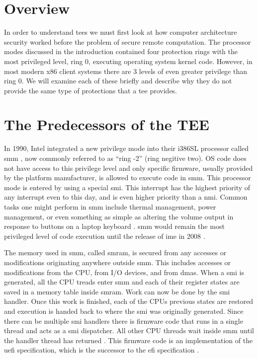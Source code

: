 \section{Overview}
In order to understand \glspl{tee} we must first look at how computer architecture security worked before the problem of secure remote computation. The processor modes discussed in the introduction contained four protection rings with the most privileged level, ring 0, executing operating system kernel code. However, in most modern x86 client systems there are 3 levels of even greater privilege than ring 0. We will examine each of these briefly and describe why they do not provide the same type of protections that a \gls{tee} provides.

\section{The Predecessors of the TEE}

In 1990, Intel integrated a new privilege mode into their i386SL processor called \gls{smm} \cite{zimmer2005hardened}, now commonly referred to as ``ring -2'' (ring negitive two).  OS code does not have access to this privilege level and only specific firmware, usually provided by the platform manufacturer, is allowed to execute code in \gls{smm}. This processor mode is entered by using a special \gls{smi}. This interrupt has the highest priority of any interrupt even to this day, and is even higher priority than a \gls{nmi}. Common tasks one might perform in \gls{smm} include thermal management, power management, or even something as simple as altering the volume output in response to buttons on a laptop keyboard \cite{yao2009system}. \gls{smm} would remain the most privileged level of code execution until the release of \gls{ime} in 2008 \cite{eldar2008configuring}.

The memory used in \gls{smm}, called \gls{smram}, is secured from any accesses or modifications originating anywhere outside \gls{smm}. This includes accesses or modifications from the CPU, from I/O devices, and from \glspl{dma}. When a \gls{smi} is generated, all the CPU treads enter \gls{smm} and each of their register states are saved in a memory table inside \gls{smram}. Work can now be done by the \gls{smi} handler. Once this work is finished, each of the CPUs previous states are restored and execution is handed back to where the \gls{smi} was originally generated. Since there can be multiple \gls{smi} handlers there is firmware code that runs in a single thread and acts as a \gls{smi} dispatcher. All other CPU threads wait inside \gls{smm} until the handler thread has returned \cite{delgado2013}. This firmware code is an implementation of the \gls{uefi} specification, which is the successor to the \gls{efi} specification \cite{beyondBIOS}.

